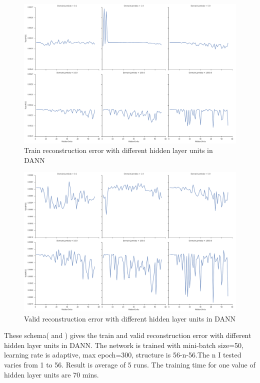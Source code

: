 \begin{figure}[htbp]
	\centering
	\includegraphics[width=15cm]{Figures/5.png}
	\caption[Train reconstruction error with different hidden layer units in DANN]{Train reconstruction error with different hidden layer units in DANN}
	\label{fig:5}
\end{figure}

\begin{figure}[htbp]
	\centering
	\includegraphics[width=15cm]{Figures/7.png}
	\caption[Valid reconstruction error with different hidden layer units in DANN]{Valid reconstruction error with different hidden layer units in DANN}
	\label{fig:7}
\end{figure}

These schema( and ) gives the train and valid reconstruction error with different hidden layer units in DANN. The network is trained with mini-batch size=50, learning rate is adaptive, max epoch=300, structure is 56-n-56.The n I tested varies from 1 to 56. Result is average of 5 runs. The training time for one value of hidden layer units are 70 mins.

